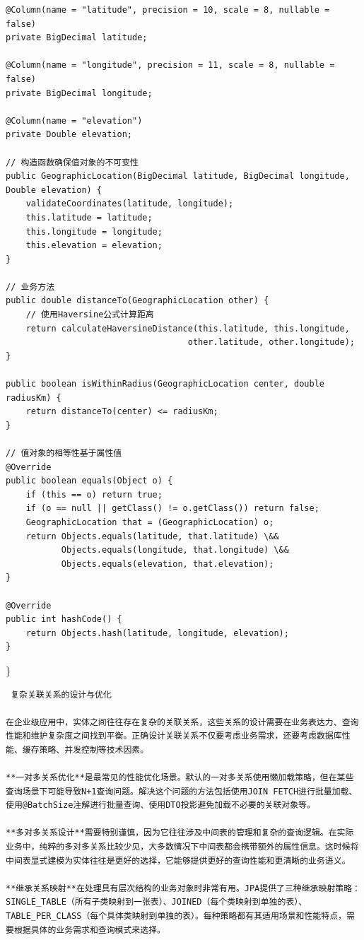 \begin{verbatim}
@Column(name = "latitude", precision = 10, scale = 8, nullable = false)
private BigDecimal latitude;

@Column(name = "longitude", precision = 11, scale = 8, nullable = false)
private BigDecimal longitude;

@Column(name = "elevation")
private Double elevation;

// 构造函数确保值对象的不可变性
public GeographicLocation(BigDecimal latitude, BigDecimal longitude, Double elevation) {
    validateCoordinates(latitude, longitude);
    this.latitude = latitude;
    this.longitude = longitude;
    this.elevation = elevation;
}

// 业务方法
public double distanceTo(GeographicLocation other) {
    // 使用Haversine公式计算距离
    return calculateHaversineDistance(this.latitude, this.longitude, 
                                    other.latitude, other.longitude);
}

public boolean isWithinRadius(GeographicLocation center, double radiusKm) {
    return distanceTo(center) <= radiusKm;
}

// 值对象的相等性基于属性值
@Override
public boolean equals(Object o) {
    if (this == o) return true;
    if (o == null || getClass() != o.getClass()) return false;
    GeographicLocation that = (GeographicLocation) o;
    return Objects.equals(latitude, that.latitude) \&&
           Objects.equals(longitude, that.longitude) \&&
           Objects.equals(elevation, that.elevation);
}

@Override
public int hashCode() {
    return Objects.hash(latitude, longitude, elevation);
}
\end{verbatim}

\}

\begin{lstlisting}
 复杂关联关系的设计与优化

在企业级应用中，实体之间往往存在复杂的关联关系，这些关系的设计需要在业务表达力、查询性能和维护复杂度之间找到平衡。正确设计关联关系不仅要考虑业务需求，还要考虑数据库性能、缓存策略、并发控制等技术因素。

**一对多关系优化**是最常见的性能优化场景。默认的一对多关系使用懒加载策略，但在某些查询场景下可能导致N+1查询问题。解决这个问题的方法包括使用JOIN FETCH进行批量加载、使用@BatchSize注解进行批量查询、使用DTO投影避免加载不必要的关联对象等。

**多对多关系设计**需要特别谨慎，因为它往往涉及中间表的管理和复杂的查询逻辑。在实际业务中，纯粹的多对多关系比较少见，大多数情况下中间表都会携带额外的属性信息。这时候将中间表显式建模为实体往往是更好的选择，它能够提供更好的查询性能和更清晰的业务语义。

**继承关系映射**在处理具有层次结构的业务对象时非常有用。JPA提供了三种继承映射策略：SINGLE_TABLE（所有子类映射到一张表）、JOINED（每个类映射到单独的表）、TABLE_PER_CLASS（每个具体类映射到单独的表）。每种策略都有其适用场景和性能特点，需要根据具体的业务需求和查询模式来选择。
\end{lstlisting}

